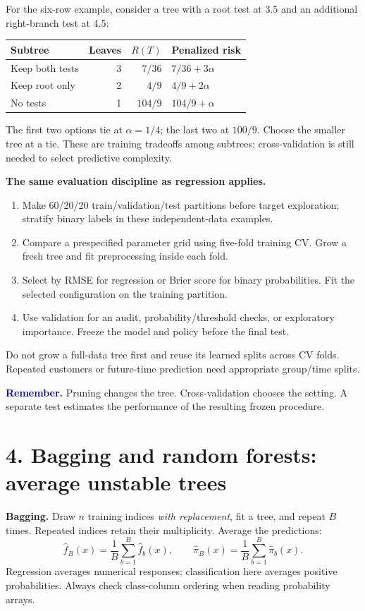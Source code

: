 \documentclass[11pt,a4paper]{article}
\newcommand{\idea}[1]{\textcolor{navy}{\textbf{Remember.}} #1}
\begin{document}
For the six-row example, consider a tree with a root test at 3.5 and an
additional right-branch test at 4.5:
\begin{center}
\begin{tabular}{@{}lrrl@{}}\toprule
Subtree & Leaves & $R(T)$ & Penalized risk\\\midrule
Keep both tests & 3 & $7/36$ & $7/36+3\alpha$\\
Keep root only & 2 & $4/9$ & $4/9+2\alpha$\\
No tests & 1 & $104/9$ & $104/9+\alpha$\\\bottomrule
\end{tabular}
\end{center}
The first two options tie at $\alpha=1/4$; the last two at $100/9$.
Choose the smaller tree at a tie. These are training tradeoffs among subtrees;
cross-validation is still needed to select predictive complexity.

\textbf{The same evaluation discipline as regression applies.}
\begin{enumerate}
\item Make 60/20/20 train/validation/test partitions before target exploration;
      stratify binary labels in these independent-data examples.
\item Compare a prespecified parameter grid using five-fold training CV.
      Grow a fresh tree and fit preprocessing inside each fold.
\item Select by RMSE for regression or Brier score for binary probabilities.
      Fit the selected configuration on the training partition.
\item Use validation for an audit, probability/threshold checks, or exploratory
      importance. Freeze the model and policy before the final test.
\end{enumerate}
Do not grow a full-data tree first and reuse its learned splits across CV folds.
Repeated customers or future-time prediction need appropriate group/time splits.

\idea{Pruning changes the tree. Cross-validation chooses the setting. A separate
test estimates the performance of the resulting frozen procedure.}

\newpage
\section*{4. Bagging and random forests: average unstable trees}
\textbf{Bagging.} Draw $n$ training indices \emph{with replacement}, fit a tree,
and repeat $B$ times. Repeated indices retain their multiplicity. Average the
predictions:
\[
\widehat f_B(x)=\frac1B\sum_{b=1}^B\widehat f_b(x),\qquad
\widehat\pi_B(x)=\frac1B\sum_{b=1}^B\widehat\pi_b(x).
\]
Regression averages numerical responses; classification here averages positive
probabilities. Always check class-column ordering when reading probability arrays.
\end{document}
